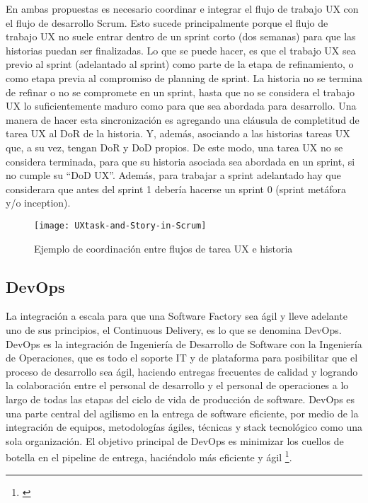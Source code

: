 En ambas propuestas es necesario coordinar e integrar el flujo de trabajo UX con el flujo de desarrollo Scrum. Esto sucede principalmente porque el flujo de trabajo UX no suele entrar dentro de un sprint corto (dos semanas) para que las historias puedan ser finalizadas. Lo que se puede hacer, es que el trabajo UX sea previo al sprint (adelantado al sprint) como parte de la etapa de refinamiento, o como etapa previa al compromiso de planning de sprint. La historia no se termina de refinar o no se compromete en un sprint, hasta que no se considera el trabajo UX lo suficientemente maduro como para que sea abordada para desarrollo. Una manera de hacer esta sincronización es agregando una cláusula de completitud de tarea UX al DoR de la historia. Y, además, asociando a las historias tareas UX que, a su vez, tengan DoR y DoD propios. De este modo, una tarea UX no se considera terminada, para que su historia asociada sea abordada en un sprint, si no cumple su “DoD UX”. Además, para trabajar a sprint adelantado hay que considerara que antes del sprint 1 debería hacerse un sprint 0 (sprint metáfora y/o inception).

\begin{figure}[h]
  \centering
  \texttt{[image: UXtask-and-Story-in-Scrum]}
  \caption{Ejemplo de coordinación entre flujos de tarea UX e historia}
  \centering
  \label{fig:UXtask-and-Story-in-Scrum} %
\end{figure}

\subsection{DevOps}

La integración a escala para que una Software Factory sea ágil y lleve adelante uno de sus principios, el Continuous Delivery, es lo que se denomina DevOps. DevOps es la integración de Ingeniería de Desarrollo de Software con la Ingeniería de Operaciones, que es todo el soporte IT y de plataforma para posibilitar que el proceso de desarrollo sea ágil, haciendo entregas frecuentes de calidad y logrando la colaboración entre el personal de desarrollo y el personal de operaciones a lo largo de todas las etapas del ciclo de vida de producción de software. DevOps es una parte central del agilismo en la entrega de software eficiente, por medio de la integración de equipos, metodologías ágiles, técnicas y stack tecnológico como una sola organización. El objetivo principal de DevOps es minimizar los cuellos de botella en el pipeline de entrega, haciéndolo más eficiente y ágil \footnote{\cite{DevOps-for-dummies-2015}}.

